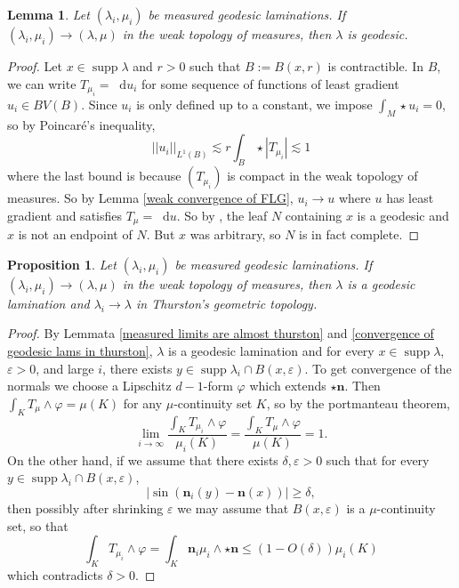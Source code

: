 \documentclass[reqno,11pt]{amsart}
\newcommand*\dif{\mathop{}\!\mathrm{d}}
\DeclareMathOperator{\supp}{supp}
\newcommand{\normal}{\mathbf n}
\newtheorem{lemma}[theorem]{Lemma}
\newtheorem{proposition}[theorem]{Proposition}
\theoremstyle{definition}
\numberwithin{equation}{section}
\begin{document}
\begin{lemma}\label{limits of measured geodesic lams are geodesic}
Let $(\lambda_i, \mu_i)$ be measured geodesic laminations.
If $(\lambda_i, \mu_i) \to (\lambda, \mu)$ in the weak topology of measures, then $\lambda$ is geodesic.
\end{lemma}
\begin{proof}
Let $x \in \supp \lambda$ and $r > 0$ such that $B := B(x, r)$ is contractible.
In $B$, we can write $T_{\mu_i} = \dif u_i$ for some sequence of functions of least gradient $u_i \in BV(B)$.
Since $u_i$ is only defined up to a constant, we impose $\int_M \star u_i = 0$, so by Poincar\'e's inequality,
$$||u_i||_{L^1(B)} \lesssim r\int_B \star |T_{\mu_i}| \lesssim 1$$
where the last bound is because $(T_{\mu_i})$ is compact in the weak topology of measures.
So by Lemma \ref{weak convergence of FLG}, $u_i \to u$ where $u$ has least gradient and satisfies $T_\mu = \dif u$.
So by \cite{BackusFLG}, the leaf $N$ containing $x$ is a geodesic and $x$ is not an endpoint of $N$.
But $x$ was arbitrary, so $N$ is in fact complete.
\end{proof}

\begin{proposition}\label{measured implies Thurston}
Let $(\lambda_i, \mu_i)$ be measured geodesic laminations.
If $(\lambda_i, \mu_i) \to (\lambda, \mu)$ in the weak topology of measures, then $\lambda$ is a geodesic lamination and $\lambda_i \to \lambda$ in Thurston's geometric topology.
\end{proposition}
\begin{proof}
By Lemmata \ref{measured limits are almost thurston} and \ref{convergence of geodesic lams in thurston},
$\lambda$ is a geodesic lamination and for every $x \in \supp \lambda$, $\varepsilon > 0$, and large $i$, there exists $y \in \supp \lambda_i \cap B(x, \varepsilon)$.
To get convergence of the normals we choose a Lipschitz $d-1$-form $\varphi$ which extends $\star \normal$.
Then $\int_K T_\mu \wedge \varphi = \mu(K)$ for any $\mu$-continuity set $K$, so by the portmanteau theorem,
$$\lim_{i \to \infty} \frac{\int_K T_{\mu_i} \wedge \varphi}{\mu_i(K)} = \frac{\int_K T_\mu \wedge \varphi}{\mu(K)} = 1.$$
On the other hand, if we assume that there exists $\delta, \varepsilon > 0$ such that for every $y \in \supp \lambda_i \cap B(x, \varepsilon)$,
$$|\sin(\normal_i(y) - \normal(x))| \geq \delta,$$
then possibly after shrinking $\varepsilon$ we may assume that $B(x, \varepsilon)$ is a $\mu$-continuity set, so that
$$\int_K T_{\mu_i} \wedge \varphi = \int_K \normal_i\mu_i \wedge \star \normal \leq (1 - O(\delta)) \mu_i(K)$$
which contradicts $\delta > 0$.
\end{proof}
\end{document}
